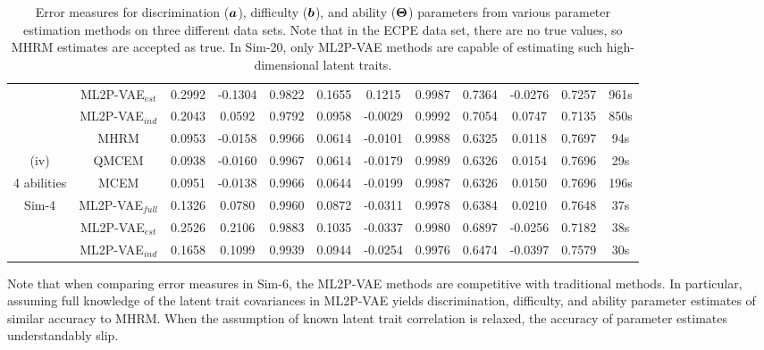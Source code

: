 \begin{table}
{\begin{tabular}{c|c|ccc|ccc|ccc|c}
& ML2P-VAE$_{est}$ & 0.2992  & -0.1304  & 0.9822  & 0.1655 &  0.1215  & 0.9987  & 0.7364   & -0.0276  & 0.7257 & 961s \\
& ML2P-VAE$_{ind}$ & 0.2043 &   0.0592  & 0.9792  & 0.0958   & -0.0029  & 0.9992  & 0.7054 &  0.0747  & 0.7135 & 850s \\
\hline 
        & MHRM & 0.0953 & -0.0158	&	0.9966 & 0.0614 & -0.0101 &	0.9988 & 0.6325	& 0.0118	& 0.7697 & 94s \\
        (iv)& QMCEM & 0.0938 & -0.0160	&	0.9967 & 0.0614 & -0.0179 &	0.9989 & 0.6326	& 0.0154	& 0.7696 & 29s \\
        4 abilities & MCEM & 0.0951 & -0.0138	&	0.9966 & 0.0644 & -0.0199 &	0.9987 & 0.6326	& 0.0150	& 0.7696 & 196s \\
       Sim-4 & ML2P-VAE$_{full}$ & 0.1326 & 0.0780		&	0.9960 & 0.0872 & -0.0311 &	0.9978 & 0.6384	& 0.0210	& 0.7648 & 37s \\
        & ML2P-VAE$_{est}$ & 0.2526 & 0.2106		&	0.9883 & 0.1035 & -0.0337 &	0.9980 & 0.6897	& -0.0256 	& 0.7182 & 38s \\
        & ML2P-VAE$_{ind}$ & 0.1658 & 0.1099		&	0.9939 & 0.0944 & -0.0254 &	0.9976 & 0.6474	& -0.0397	& 0.7579 & 30s \\

\hline
\end{tabular}
\caption{Error measures for discrimination ($\boldsymbol{a}$), difficulty ($\boldsymbol{b}$), and ability ($\boldsymbol{\Theta}$) parameters from various parameter estimation methods on three different data sets. Note that in the ECPE data set, there are no true values, so MHRM estimates are accepted as true. In Sim-20, only ML2P-VAE methods are capable of estimating such high-dimensional latent traits.}
  \label{tab:ml2p_results}
}
\end{table}

Note that when comparing error measures in Sim-6, the ML2P-VAE methods are competitive with traditional methods. In particular, assuming full knowledge of the latent trait covariances in ML2P-VAE yields discrimination, difficulty, and ability parameter estimates of similar accuracy to MHRM. When the assumption of known latent trait correlation is relaxed, the accuracy of parameter estimates understandably slip.

